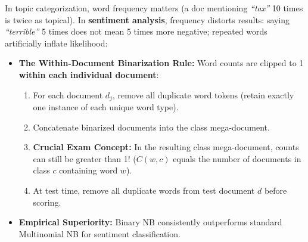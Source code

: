 \documentclass[10pt,a4paper]{article}
\begin{document}
\par\vspace{1pt}
In topic categorization, word frequency matters (a doc mentioning \textit{``tax''} 10 times is twice as topical). In \textbf{sentiment analysis}, frequency distorts results: saying \textit{``terrible''} 5 times does not mean 5 times more negative; repeated words artificially inflate likelihood:
\begin{itemize}[leftmargin=12pt, itemsep=0.5pt, parsep=0pt, topsep=0.5pt]
    \item \textbf{The Within-Document Binarization Rule:} Word counts are clipped to 1 \textbf{within each individual document}:
    \begin{enumerate}[leftmargin=14pt, itemsep=0.5pt, parsep=0pt]
        \item For each document $d_j$, remove all duplicate word tokens (retain exactly one instance of each unique word type).
        \item Concatenate binarized documents into the class mega-document.
        \item \textbf{Crucial Exam Concept:} In the resulting class mega-document, counts can still be greater than 1! ($C(w, c)$ equals the number of documents in class $c$ containing word $w$).
        \item At test time, remove all duplicate words from test document $d$ before scoring.
    \end{enumerate}
    \item \textbf{Empirical Superiority:} Binary NB consistently outperforms standard Multinomial NB for sentiment classification.
\end{itemize}

\vspace{-2pt}
\end{document}

